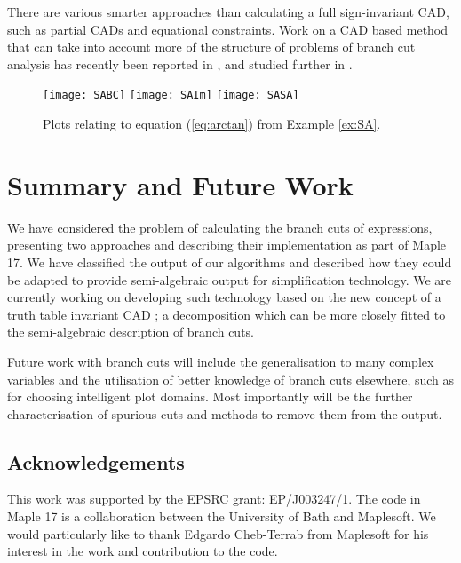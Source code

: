 \documentclass{llncs}
\begin{document}
There are various smarter approaches than calculating a full sign-invariant CAD, such as partial CADs and equational constraints.  Work on a CAD based method that can take into account more of the structure of problems of branch cut analysis has recently been reported in \cite{BDEMW13}, and studied further in \cite{BDEW13}.


\begin{figure}[ht] 
\begin{center}
\texttt{[image: SABC]}
\hspace*{0.3cm}
\texttt{[image: SAIm]}
\hspace*{0.3cm}
\texttt{[image: SASA]}
\end{center}
\caption{Plots relating to equation (\ref{eq:arctan}) from Example \ref{ex:SA}.} 
\label{fig:SA}
\end{figure}

\section{Summary and Future Work}

We have considered the problem of calculating the branch cuts of expressions, presenting two approaches and describing their implementation as part of {\sc Maple} 17.  We have classified the output of our algorithms and described how they could be adapted to provide semi-algebraic output for simplification technology.  We are currently working on developing such technology based on the new concept of a truth table invariant CAD \cite{BDEMW13, BDEW13}; a decomposition which can be more closely fitted to the semi-algebraic description of branch cuts.  

Future work with branch cuts will include the generalisation to many complex variables and the utilisation of better knowledge of branch cuts elsewhere, such as for choosing intelligent plot domains.  Most importantly will be the further characterisation of spurious cuts and methods to remove them from the output.


\subsection*{Acknowledgements}

This work was supported by the EPSRC grant: EP/J003247/1.  The code in {\sc Maple} 17 is a collaboration between the University of Bath and Maplesoft.  We would particularly like to thank Edgardo Cheb-Terrab from Maplesoft for his interest in the work and contribution to the code.  
\end{document}
